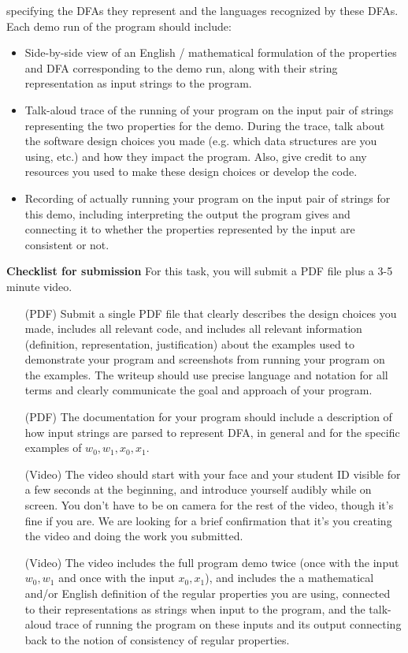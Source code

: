 \begin{enumerate}
specifying the DFAs they represent and the languages recognized by these DFAs.
Each demo run of the program should include: 
\begin{itemize}
\item Side-by-side view of an English / mathematical formulation of the properties and DFA corresponding to the demo run, along with their string representation as input strings to the program.
\item Talk-aloud trace of the running of your program on the input pair of strings representing the two properties for the demo. During the trace, talk about the software design choices you made
(e.g. which data structures are you using, etc.) and how they impact the program. Also, give credit to any resources you used to make these design choices or develop the code. 
\item Recording of actually running your program on the input pair of strings for this demo, including interpreting the output the program gives and connecting it to whether the properties represented by the input are consistent or not.
\end{itemize}
\end{enumerate}

\newpage 

{\bf Checklist for submission} For this task, you will submit a PDF file plus a 3-5 minute video.


\begin{itemize}
   \item[(PDF)] Submit a single PDF file that clearly describes the design choices you made, includes
   all relevant code, and includes all relevant information (definition, representation, justification) about the examples used to demonstrate your program and screenshots from running your program on the examples. The writeup should use precise language and notation for all terms and clearly communicate the goal and approach of your program.
   \item[(PDF)] The documentation for your program should include a description of how input strings are parsed to represent DFA, in general and for the specific examples of $w_0, w_1, x_0, x_1$.
   \item[(Video)] The video should start with your face and your student ID visible for a few seconds at the beginning, and introduce yourself audibly while on screen. You don't have to be on camera for the  rest of the video, though it's fine if you are. We are looking for a brief confirmation that  it's you creating the video and doing the work you submitted.
\item[(Video)] The video includes the full program demo twice (once with the input $w_0,w_1$ and once with the input $x_0,x_1$), and includes the 
a mathematical and/or English definition of the regular properties you are using, connected to their
representations as strings when input to the program, and the talk-aloud trace of running the program on these inputs and its output connecting back to the notion of consistency of regular properties.
\end{itemize}

